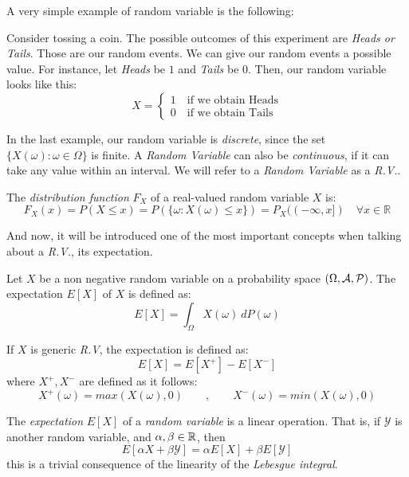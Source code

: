 A very simple example of random variable is the following:

\begin{nexample}
  Consider tossing a coin. The possible outcomes of this experiment are \emph{Heads or Tails}. Those are our random events. We can give our random events a possible value. For instance, let \emph{Heads} be $1$ and \emph{Tails} be 0. Then, our random variable looks like this:
  \begin{equation*}
      X  = \left\{ \begin{aligned}
  1 \quad \text{if we obtain Heads} \\
  0 \quad \text{if we obtain Tails}
\end{aligned}\right.
  \end{equation*}

\end{nexample}

In the last example, our random variable is \emph{discrete}, since the set $\{X(\omega): \omega \in \Omega\}$ is finite. A \emph{Random Variable} can also be \emph{continuous}, if it can take any value within an interval.
We will refer to a \emph{Random Variable} as a \emph{R.V.}. \\

\begin{ndef}
The \emph{distribution function } $F_X$ of a real-valued random variable $X$ is:
$$
F_X(x) = P(X \leq x) = P(\{\omega : X(\omega) \leq x\}) = P_X((-\infty,x]) \quad \forall x \in \mathbb R
$$
\end{ndef}

And now, it will be introduced one of the most important concepts when talking about a \emph{R.V.}, its expectation.

\begin{ndef}
Let $X$ be a non negative random variable on a probability space $(\Omega,\mathcal{A},\mathcal{P})$. The expectation $E[X]$ of $X$ is defined as:
$$
E[X] = \int_\Omega X(\omega) \ dP(\omega)
$$
\end{ndef}
If $X$ is generic \emph{R.V}, the expectation is defined as:
$$
E[X] = E[X^+] - E[X^-]
$$
where $X^+,X^-$ are defined as it follows:
$$
X^+(\omega) = max(X(\omega),0) \quad \quad , \quad \quad X^-(\omega) = min(X(\omega),0)
$$

The \emph{expectation} $E[X]$ of a \emph{random variable} is a linear operation. That is, if $\mathcal Y$ is another random variable, and $\alpha,\beta \in \mathbb{R}$, then
$$
E[\alpha X + \beta \mathcal Y] = \alpha E[X] + \beta E[\mathcal Y]
$$
this is a trivial consequence of the linearity of the \emph{Lebesgue integral}.


